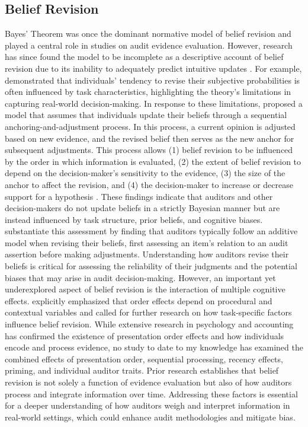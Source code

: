 \documentclass[12pt,english]{article}
\begin{document}
\subsection{Belief Revision}
\hspace*{2em} Bayes’ Theorem was once the dominant normative model of belief revision and played a central role in studies on audit evidence evaluation. However, research has since found the model to be incomplete as a descriptive account of belief revision due to its inability to adequately predict intuitive updates \citep{ashton1988}. For example, \citet{pitz1967} demonstrated that individuals’ tendency to revise their subjective probabilities is often influenced by task characteristics, highlighting the theory’s limitations in capturing real-world decision-making.
In response to these limitations, \citet{hogarth1992} proposed a model that assumes that individuals update their beliefs through a sequential anchoring-and-adjustment process. In this process, a current opinion is adjusted based on new evidence, and the revised belief then serves as the new anchor for subsequent adjustments. This process allows (1) belief revision to be influenced by the order in which information is evaluated, (2) the extent of belief revision to depend on the decision-maker’s sensitivity to the evidence, (3) the size of the anchor to affect the revision, and (4) the decision-maker to increase or decrease support for a hypothesis \citep{krishnamoorthy1999}. These findings indicate that auditors and other decision-makers do not update beliefs in a strictly Bayesian manner but are instead influenced by task structure, prior beliefs, and cognitive biases. \citet{messier1994} substantiate this assessment by finding that auditors typically follow an additive model when revising their beliefs, first assessing an item’s relation to an audit assertion before making adjustments. Understanding how auditors revise their beliefs is critical for assessing the reliability of their judgments and the potential biases that may arise in audit decision-making.
\hspace*{2em} However, an important yet underexplored aspect of belief revision is the interaction of multiple cognitive effects. \citet{hogarth1992} explicitly emphasized that order effects depend on procedural and contextual variables and called for further research on how task-specific factors influence belief revision. While extensive research in psychology and accounting has confirmed the existence of presentation order effects and how individuals encode and process evidence, no study to date to my knowledge has examined the combined effects of presentation order, sequential processing, recency effects, priming, and individual auditor traits. Prior research establishes that belief revision is not solely a function of evidence evaluation but also of how auditors process and integrate information over time. Addressing these factors is essential for a deeper understanding of how auditors weigh and interpret information in real-world settings, which could enhance audit methodologies and mitigate bias.
\end{document}
